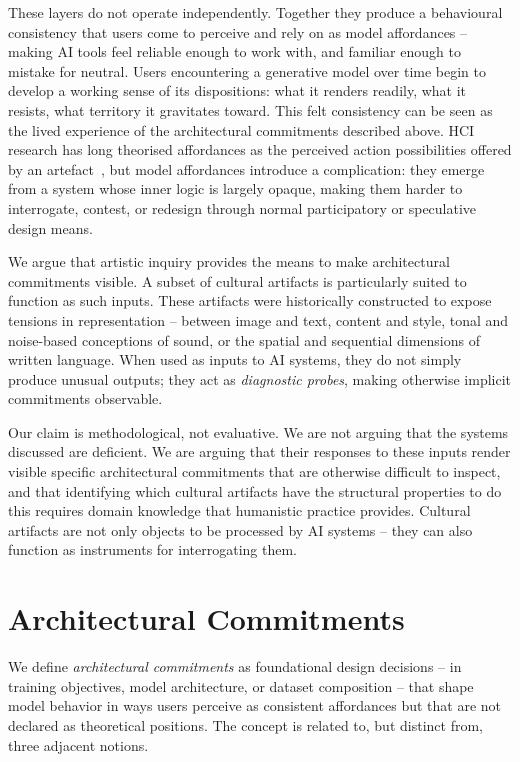 \documentclass[
  twocolumn,
]{ceurart}
\begin{document}
These layers do not operate independently. Together they produce a behavioural consistency that users come to perceive and rely on as model affordances -- making AI tools feel reliable enough to work with, and familiar enough to mistake for neutral. Users encountering a generative model over time begin to develop a working sense of its dispositions: what it renders readily, what it resists, what territory it gravitates toward. This felt consistency can be seen as the lived experience of the architectural commitments described above. HCI research has long theorised affordances as the perceived action possibilities offered by an artefact~\cite{vyas_affordance_2006}, but model affordances introduce a complication: they emerge from a system whose inner logic is largely opaque, making them harder to interrogate, contest, or redesign through normal participatory or speculative design means.

We argue that artistic inquiry provides the means to make architectural commitments visible. A subset of cultural artifacts is particularly suited to function as such inputs. These artifacts were historically constructed to expose tensions in representation -- between image and text, content and style, tonal and noise-based conceptions of sound, or the spatial and sequential dimensions of written language. When used as inputs to AI systems, they do not simply produce unusual outputs; they act as \emph{diagnostic probes}, making otherwise implicit commitments observable.

Our claim is methodological, not evaluative. We are not arguing that the systems discussed are deficient. We are arguing that their responses to these inputs render visible specific architectural commitments that are otherwise difficult to inspect, and that identifying which cultural artifacts have the structural properties to do this requires domain knowledge that humanistic practice provides. Cultural artifacts are not only objects to be processed by AI systems -- they can also function as instruments for interrogating them.

\section{Architectural Commitments}

We define \emph{architectural commitments} as foundational design decisions -- in training objectives, model architecture, or dataset composition -- that shape model behavior in ways users perceive as consistent affordances but that are not declared as theoretical positions. The concept is related to, but distinct from, three adjacent notions.
\end{document}
